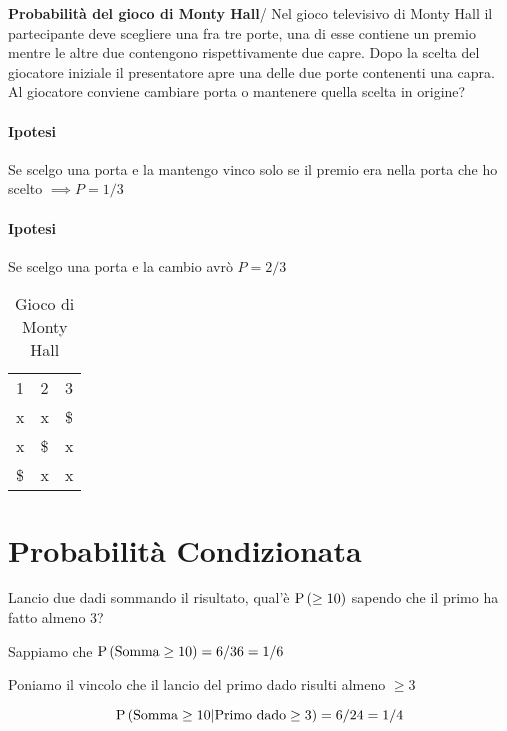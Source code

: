 \begin{exrc}
	\textbf{Probabilità del gioco di Monty Hall}/
	Nel gioco televisivo di Monty Hall il partecipante deve scegliere una fra tre porte, una di esse contiene un premio mentre le altre due contengono rispettivamente due capre. Dopo la scelta del giocatore iniziale il presentatore apre una delle due porte contenenti una capra. Al giocatore conviene cambiare porta o mantenere quella scelta in origine?
	
	\paragraph{Ipotesi} Se scelgo una porta e la mantengo vinco solo se il premio era nella porta che ho scelto $ \implies P = 1/3 $
	
	\paragraph{Ipotesi} Se scelgo una porta e la cambio avrò $ P = 2/3 $
	\begin{table}[H]
		\centering
		\caption{Gioco di Monty Hall}
		\begin{tabular}{lll}
			1  & 2  & 3  \\
			x  & x  & \$ \\
			x  & \$ & x  \\
			\$ & x  & x 
		\end{tabular}
	\end{table}
\end{exrc}


\section{Probabilità Condizionata}

\begin{exmp}
	Lancio due dadi sommando il risultato, qual'è $ \text{P}\left(\geq 10\right) $ sapendo che il primo ha fatto almeno 3?
	
	Sappiamo che $ \text{P}\left(\text{Somma} \geq 10\right) = 6/36 = 1/6 $
	
	Poniamo il vincolo che il lancio del primo dado risulti almeno $ \geq 3 $
	
	\begin{equation*}
	\text{P}\left(\text{Somma} \geq 10 | \text{Primo dado} \geq 3\right) = 6/24 = 1/4
	\end{equation*}
\end{exmp}




